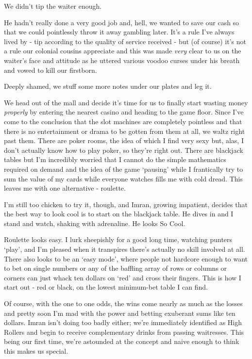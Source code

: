 \documentclass[a5paper,titlepage,11pt]{book}
\begin{document}
We didn't tip the waiter enough.

He hadn't really done a very good job and, hell, we wanted to save our cash so that we could pointlessly throw it away gambling later.  It's a rule I've always lived by - tip according to the quality of service received - but (of course) it's not a rule our colonial cousins appreciate and this was made \emph{very} clear to us on the waiter's face and attitude as he uttered various voodoo curses under his breath and vowed to kill our firstborn.

Deeply shamed, we stuff some more notes under our plates and leg it.

We head out of the mall and decide it's time for us to finally start wasting money \emph{properly} by entering the nearest casino and heading to the game floor.  Since I've come to the conclusion that the slot machines are completely pointless and that there is no entertainment or drama to be gotten from them at all, we waltz right past them.  There are poker rooms, the idea of which I find very sexy but, alas, I don't actually know how to play poker, so they're right out.  There are blackjack tables but I'm incredibly worried that I cannot do the simple mathematics required on demand and the idea of the game `pausing' while I frantically try to sum the value of my cards while everyone watches fills me with cold dread.  This leaves me with one alternative - roulette. 

I'm still too chicken to try it, though, and Imran, growing impatient, decides that the best way to look cool is to start on the blackjack table.  He dives in and I stand and watch, shaking with adrenaline.  He looks So Cool.

Roulette looks easy.  I lurk sheepishly for a good long time, watching punters `play', and I'm pleased when it transpires there's actually no skill involved at all.  There also looks to be an `easy mode', where people not hardcore enough to want to bet on single numbers or any of the baffling array of rows or columns or corners can just whack ten dollars on `red' and cross their fingers.  This is how I start out - red or black, on the lowest minimum-bet table I can find.

Of course, with the one to one odds, the wins come nearly as much as the losses and pretty soon I'm mad with the power and betting exuberant sums like ten dollars.  Imran isn't doing too badly either; we're immediately identified as High Rollers and begin to receive complementary drinks from passing waitresses.  This being our first time, we're astounded at the concept and naive enough to think this makes us special.
\end{document}
